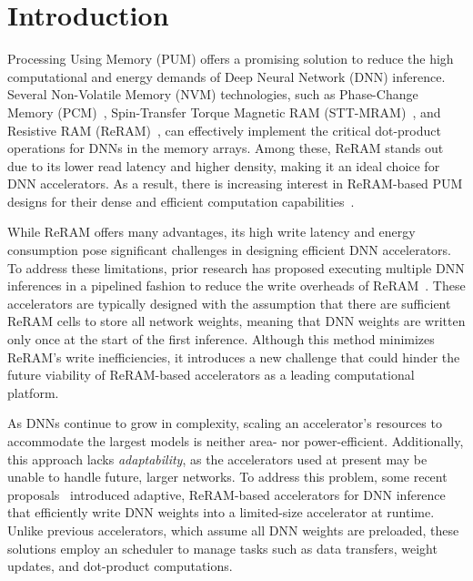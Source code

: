 
\section{Introduction}\label{s:intro}
Processing Using Memory (PUM) offers a promising solution to reduce the high computational and energy demands of Deep Neural Network (DNN) inference. Several Non-Volatile Memory (NVM) technologies, such as Phase-Change Memory (PCM)~\cite{PCM}, Spin-Transfer Torque Magnetic RAM (STT-MRAM)~\cite{STT}, and Resistive RAM (ReRAM)~\cite{ResiRCA}, can effectively implement the critical dot-product operations for DNNs in the memory arrays. Among these, ReRAM stands out due to its lower read latency and higher density, making it an ideal choice for DNN accelerators. As a result, there is increasing interest in ReRAM-based PUM designs for their dense and efficient computation capabilities~\cite{PRIME, sparse_ReRAM, CASCADE}.

While ReRAM offers many advantages, its high write latency and energy consumption pose significant challenges in designing efficient DNN accelerators. To address these limitations, prior research has proposed executing multiple DNN inferences in a pipelined fashion to reduce the write overheads of ReRAM~\cite{RAPIDNN, FORMS, ISAAC, TIMELY, AtomLayer, NVMExplorer, RAELLA, Neurosim_mapping, PUMA}. These accelerators are typically designed with the assumption that there are sufficient ReRAM cells to store all network weights, meaning that DNN weights are written only once at the start of the first inference. Although this method minimizes ReRAM's write inefficiencies, it introduces a new challenge that could hinder the future viability of ReRAM-based accelerators as a leading computational platform.

As DNNs continue to grow in complexity, scaling an accelerator's resources to accommodate the largest models is neither area- nor power-efficient. Additionally, this approach lacks \textit{adaptability}, as the accelerators used at present may be unable to handle future, larger networks. To address this problem, some recent proposals~\cite{ARAS, MNEMOSENE, PipeLayer} introduced adaptive, ReRAM-based accelerators for DNN inference that efficiently write DNN weights into a limited-size accelerator at runtime. Unlike previous accelerators, which assume all DNN weights are preloaded, these solutions employ an scheduler to manage tasks such as data transfers, weight updates, and dot-product computations.

